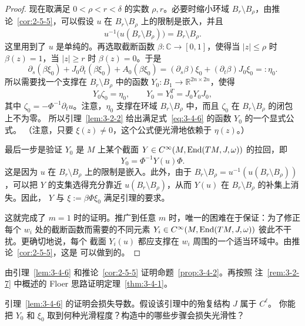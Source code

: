 \begin{proof}
现在取满足 $0<\rho<r<\delta$ 的实数 $\rho,r$。必要时缩小环域
$B_r\setminus B_\rho$，由推论~\ref{cor:2-5-5}，可以假设 $u$ 在
$B_r\setminus B_\rho$ 上的限制是嵌入，并且
\[
  u^{-1}\bigl(u(B_r\setminus B_\rho)\bigr)=B_r\setminus B_\rho.
\]
这里用到了 $u$ 是单纯的。再选取截断函数 $\beta:\mathbb C\to[0,1]$，使得当
$|z|\le\rho$ 时 $\beta(z)=1$，当 $|z|\ge r$ 时 $\beta(z)=0$。于是
\[
  \partial_s(\beta\xi_0)+J_0\partial_t(\beta\xi_0)+A_0(\beta\xi_0)
  =(\partial_s\beta)\xi_0+(\partial_t\beta)J_0\xi_0=: \eta_0.
\]
所以需要找一个支撑在 $B_r\setminus B_\rho$ 中的函数
$Y_0:B_1\to\mathbb R^{2n\times2n}$，使得
\begin{equation}\label{eq:3-4-6}
  Y_0\zeta_0=\eta_0,\qquad
  Y_0=Y_0^T=J_0Y_0J_0,
\end{equation}
其中 $\zeta_0=-\Phi^{-1}\partial_tu$。注意，$\eta_0$ 支撑在环域
$B_r\setminus B_\rho$ 中，而且 $\zeta_0$ 在 $B_r\setminus B_\rho$ 的闭包上不为零。
所以引理~\ref{lem:3-2-2} 给出满足式~\eqref{eq:3-4-6} 的函数 $Y_0$ 的一个显式公式。
（注意，只要 $\xi(z)\ne0$，这个公式便光滑地依赖于 $\eta(z)$。）

最后一步是验证 $Y_0$ 是 $M$ 上某个截面
$Y\in C^\infty(M,\operatorname{End}(TM,J,\omega))$ 的拉回，即
\[
  Y_0=\Phi^{-1}Y(u)\Phi.
\]
这是因为 $u$ 在 $B_r\setminus B_\rho$ 上的限制是嵌入。此外，由于
$B_r\setminus B_\rho=u^{-1}(u(B_r\setminus B_\rho))$，可以把 $Y$ 的支集选得充分靠近
$u(B_r\setminus B_\rho)$，从而 $Y(u)$ 在 $B_r\setminus B_\rho$ 的补集上消失。因此，
$Y$ 与 $\xi:=\beta\Phi\xi_0$ 满足引理的要求。

这就完成了 $m=1$ 时的证明。推广到任意 $m$ 时，唯一的困难在于保证：为了修正每个
$w_i$ 处的截断函数而需要的不同元素
$Y_i\in C^\infty(M,\operatorname{End}(TM,J,\omega))$ 彼此不干扰。更确切地说，每个
截面 $Y_i(u)$ 都应支撑在 $w_i$ 周围的一个适当环域中。由推论~\ref{cor:2-5-5}，这是
可以做到的。
\end{proof}

\begin{exercise}\label{ex:3-4-7}
由引理~\ref{lem:3-4-6} 和推论~\ref{cor:2-5-5} 证明命题~\ref{prop:3-4-2}。再按照
注~\ref{rem:3-2-7} 中概述的 Floer 思路证明定理~\ref{thm:3-4-1}。
\end{exercise}

\begin{exercise}\label{ex:3-4-8}
引理~\ref{lem:3-4-6} 的证明会损失导数。假设该引理中的殆复结构 $J$ 属于 $C^\ell$。
你能把 $Y_0$ 和 $\xi_0$ 取到何种光滑程度？构造中的哪些步骤会损失光滑性？
\end{exercise}
